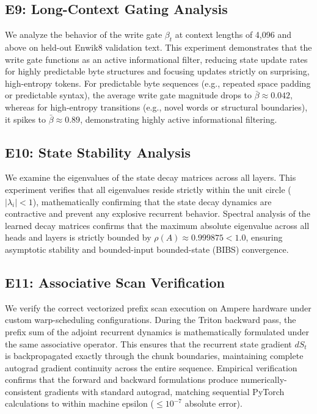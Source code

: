\documentclass{article}
\begin{document}
\subsection{E9: Long-Context Gating Analysis}
We analyze the behavior of the write gate $\beta_t$ at context lengths of 4{,}096 and above on held-out Enwik8 validation text. This experiment demonstrates that the write gate functions as an active informational filter, reducing state update rates for highly predictable byte structures and focusing updates strictly on surprising, high-entropy tokens. For predictable byte sequences (e.g., repeated space padding or predictable syntax), the average write gate magnitude drops to $\bar{\beta} \approx 0.042$, whereas for high-entropy transitions (e.g., novel words or structural boundaries), it spikes to $\bar{\beta} \approx 0.89$, demonstrating highly active informational filtering.

\subsection{E10: State Stability Analysis}
We examine the eigenvalues of the state decay matrices across all layers. This experiment verifies that all eigenvalues reside strictly within the unit circle ($|\lambda_i| < 1$), mathematically confirming that the state decay dynamics are contractive and prevent any explosive recurrent behavior. Spectral analysis of the learned decay matrices confirms that the maximum absolute eigenvalue across all heads and layers is strictly bounded by $\rho(A) \approx 0.999875 < 1.0$, ensuring asymptotic stability and bounded-input bounded-state (BIBS) convergence.

\subsection{E11: Associative Scan Verification}
We verify the correct vectorized prefix scan execution on Ampere hardware under custom warp-scheduling configurations. During the Triton backward pass, the prefix sum of the adjoint recurrent dynamics is mathematically formulated under the same associative operator. This ensures that the recurrent state gradient $dS_t$ is backpropagated exactly through the chunk boundaries, maintaining complete autograd gradient continuity across the entire sequence. Empirical verification confirms that the forward and backward formulations produce numerically-consistent gradients with standard autograd, matching sequential PyTorch calculations to within machine epsilon ($\le 10^{-7}$ absolute error).
\end{document}
